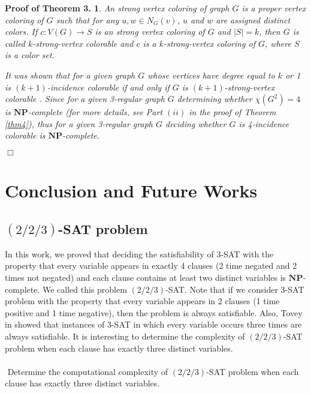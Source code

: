 \documentclass[
final
]{dmtcs-episciences}
\newtheorem{prealiii}{{\bf Proof of Theorem 3.}}
\newenvironment{aliii}[1]{\begin{prealiii}{\rm
			#1}\hfill{$\Box$}}{\end{prealiii}}
\begin{document}
\begin{aliii}{
		An {\it strong vertex coloring} of graph $G$ is a proper vertex coloring of $G$ such that for any $u,w\in N_G(v)$, $u$ and $w$ are
		assigned distinct colors. If $c: V (G)\rightarrow S$ is an strong vertex coloring of $G$ and $|S| = k$, then $G$ is called {\it $k$-strong-vertex colorable} and $c$ is a {\it $k$-strong-vertex coloring} of $G$, where $S$ is a color set.
		
		It was shown that for a given graph $G$ whose vertices have degree equal to $k$ or 1 is $(k + 1)$-incidence
		colorable if and only if $G$ is $(k + 1)$-strong-vertex colorable \cite{Kh5}. Since for a given 3-regular graph $G$ determining whether  $\chi(G^2)=4$ is $ \mathbf{NP}$-complete (for more details, see Part $(ii)$ in the proof of Theorem \ref{thm4}), thus for a given 3-regular graph $G$ deciding whether $G$ is 4-incidence colorable is $ \mathbf{NP}$-complete.
}\end{aliii}



\section{Conclusion and Future Works}


\subsection{$(2/2/3)$-SAT problem}

In this work, we proved that  deciding the satisfiability of 3-SAT with the property that every variable appears in exactly 4 clauses (2 time negated and 2 times not negated) and each clause contains at least two distinct variables is $ \mathbf{NP} $-complete. We called this problem $(2/2/3)$-SAT.
Note that if we consider  3-SAT problem  with the property that every variable appears in 2 clauses (1 time positive and 1 time negative), then the problem is always  satisfiable.
Also, Tovey in  \cite{tovey1984simplified} showed that
instances of 3-SAT in which every variable occurs three times are always satisfiable.
It is interesting to determine the complexity of  $(2/2/3)$-SAT problem when each clause has exactly three distinct variables. 
\\ \\
\textbullet $ $   Determine the computational complexity of $(2/2/3)$-SAT problem when each clause has exactly three distinct variables. 
\end{document}
